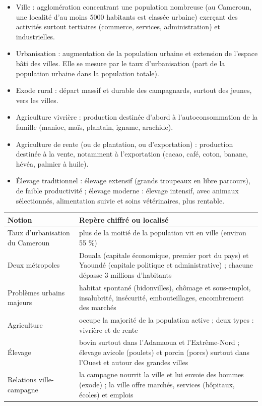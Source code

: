 \documentclass[11pt]{article}
\newcommand{\cle}[1]{{\popxbold\color{popdark}#1}}
\begin{document}
\begin{aretenir}
\begin{itemize}
  \item \cle{Ville} : agglomération concentrant une population nombreuse (au Cameroun, une localité d'au moins \num{5000} habitants est classée urbaine) exerçant des activités surtout tertiaires (commerce, services, administration) et industrielles.
  \item \cle{Urbanisation} : augmentation de la population urbaine et extension de l'espace bâti des villes. Elle se mesure par le \cle{taux d'urbanisation} (part de la population urbaine dans la population totale).
  \item \cle{Exode rural} : départ massif et durable des campagnards, surtout des jeunes, vers les villes.
  \item \cle{Agriculture vivrière} : production destinée d'abord à l'autoconsommation de la famille (manioc, maïs, plantain, igname, arachide).
  \item \cle{Agriculture de rente} (ou de plantation, ou d'exportation) : production destinée à la vente, notamment à l'exportation (cacao, café, coton, banane, hévéa, palmier à huile).
  \item \cle{Élevage traditionnel} : élevage extensif (grands troupeaux en libre parcours), de faible productivité ; \cle{élevage moderne} : élevage intensif, avec animaux sélectionnés, alimentation suivie et soins vétérinaires, plus rentable.
\end{itemize}
\end{aretenir}

\begin{aretenir}
\begin{center}
\begin{tabularx}{\linewidth}{|l|X|}\hline
\rowcolor{popblueL} \textbf{Notion} & \textbf{Repère chiffré ou localisé} \\ \hline
Taux d'urbanisation du Cameroun & plus de la moitié de la population vit en ville (environ 55 \%) \\ \hline
Deux métropoles & Douala (capitale économique, premier port du pays) et Yaoundé (capitale politique et administrative) ; chacune dépasse 3 millions d'habitants \\ \hline
Problèmes urbains majeurs & habitat spontané (bidonvilles), chômage et sous-emploi, insalubrité, insécurité, embouteillages, encombrement des marchés \\ \hline
Agriculture & occupe la majorité de la population active ; deux types : vivrière et de rente \\ \hline
Élevage & bovin surtout dans l'Adamaoua et l'Extrême-Nord ; élevage avicole (poulets) et porcin (porcs) surtout dans l'Ouest et autour des grandes villes \\ \hline
Relations ville-campagne & la campagne nourrit la ville et lui envoie des hommes (exode) ; la ville offre marchés, services (hôpitaux, écoles) et emplois \\ \hline
\end{tabularx}
\end{center}
\end{aretenir}
\end{document}
